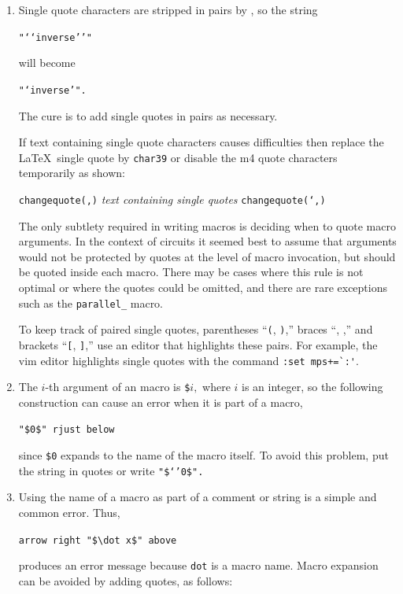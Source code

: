 \begin{enumerate}
\item 
{}
 Single quote characters are stripped in pairs by \Mfour, so the string

{\tt "{`}{`}inverse{'}{'}"}

\noindent will become

{\tt "{`}inverse{'}".}

\noindent The cure is to add single quotes in pairs as necessary.

  If text containing single quote characters causes difficulties
  then replace the \LaTeX\ single quote by {\tt \bsl{}char39} 
  or disable the m4 quote characters temporarily as shown:  

  {\tt changequote(,)} {\sl text containing single quotes} {\tt changequote(`,)}
  
  The only subtlety required in writing
  \Mfour macros is deciding when to quote macro arguments.  In the context
  of circuits it seemed best to assume that arguments would not
  be protected by quotes at the level of macro invocation, but should
  be quoted inside each macro.  There may be cases where this rule is
  not optimal or where the quotes could be omitted, and there are
  rare exceptions such as the {\tt parallel\_} macro.

  To keep track of paired single quotes, parentheses ``{\tt (}, {\tt)},''
  braces ``\lbr, \rbr,'' and brackets ``{\tt [}, {\tt ]},'' use an editor
  that highlights these pairs.  For example, the vim editor highlights
  single quotes with the command \verb|:set mps+=`:'|.

\item 
{}
The $i$-th argument of an \Mfour macro is {\tt \$}$i,$ where $i$ is
an integer, so the following construction can cause an error when it
is part of a macro,

{\tt "\$0\$" rjust below}

\noindent since {\tt \$0} expands to the name of the macro itself.
To avoid this problem, put the string in quotes or write
 {\tt "\$`'0\$".}

\item 
{}
 Using the name of a macro as part of a comment or string is a
 simple and common error. Thus,

{\tt arrow right \verb|"$\dot x$"| above}

\noindent produces an error message because {\tt dot} is a macro
name.   Macro expansion can be avoided by adding quotes, as follows:


\end{enumerate}
